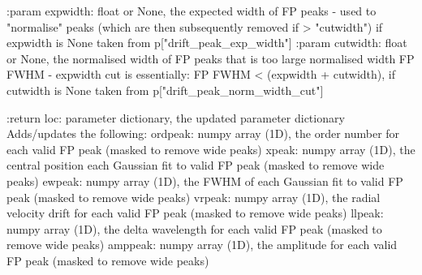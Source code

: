 \begin{minipage}{\textwidth}
\begin{pythondocstring}
:param expwidth: float or None, the expected width of FP peaks - used to
                 "normalise" peaks (which are then subsequently removed
                 if > "cutwidth") if expwidth is None taken from
                 p["drift_peak_exp_width"]
:param cutwidth: float or None, the normalised width of FP peaks that is too
                 large normalised width FP FWHM - expwidth
                 cut is essentially: FP FWHM < (expwidth + cutwidth), if
                 cutwidth is None taken from p["drift_peak_norm_width_cut"]

:return loc: parameter dictionary, the updated parameter dictionary
        Adds/updates the following:
            ordpeak: numpy array (1D), the order number for each valid FP
                     peak (masked to remove wide peaks)
            xpeak: numpy array (1D), the central position each Gaussian fit
                   to valid FP peak (masked to remove wide peaks)
            ewpeak: numpy array (1D), the FWHM of each Gaussian fit
                    to valid FP peak (masked to remove wide peaks)
            vrpeak: numpy array (1D), the radial velocity drift for each
                    valid FP peak (masked to remove wide peaks)
            llpeak: numpy array (1D), the delta wavelength for each valid
                    FP peak (masked to remove wide peaks)
            amppeak: numpy array (1D), the amplitude for each valid FP peak
                     (masked to remove wide peaks)
\end{pythondocstring}
\end{minipage}


